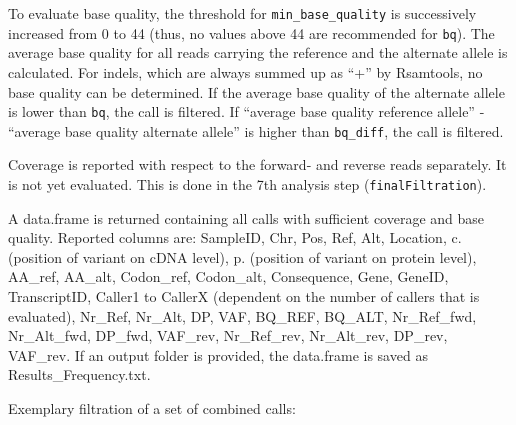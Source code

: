 \documentclass{article}
\begin{document}
To evaluate base quality, the threshold for \texttt{min\_base\_quality} is successively increased from 0 to 44 (thus, no values above 44 are recommended for \texttt{bq}). The average base quality for all reads carrying the reference and the alternate allele is calculated. For indels, which are always summed up as ``+'' by Rsamtools, no base quality can be determined. If the average base quality of the alternate allele is lower than \texttt{bq}, the call is filtered. If ``average base quality reference allele'' - ``average base quality alternate allele'' is higher than \texttt{bq\_diff}, the call is filtered.

Coverage is reported with respect to the forward- and reverse reads separately. It is not yet evaluated. This is done in the 7th analysis step (\texttt{finalFiltration}).

A data.frame is returned containing all calls with sufficient coverage and base quality.  Reported columns are: SampleID, Chr, Pos, Ref, Alt, Location, c. (position of variant on cDNA level), p. (position of variant on protein level), AA\_ref, AA\_alt, Codon\_ref, Codon\_alt, Consequence, Gene, GeneID, TranscriptID, Caller1 to CallerX (dependent on the number of callers that is evaluated), Nr\_Ref, Nr\_Alt, DP, VAF, BQ\_REF, BQ\_ALT, Nr\_Ref\_fwd, Nr\_Alt\_fwd, DP\_fwd, VAF\_rev, Nr\_Ref\_rev, Nr\_Alt\_rev, DP\_rev, VAF\_rev. If an output folder is provided, the data.frame is saved as Results\_Frequency.txt.

Exemplary filtration of a set of combined calls:
\end{document}
